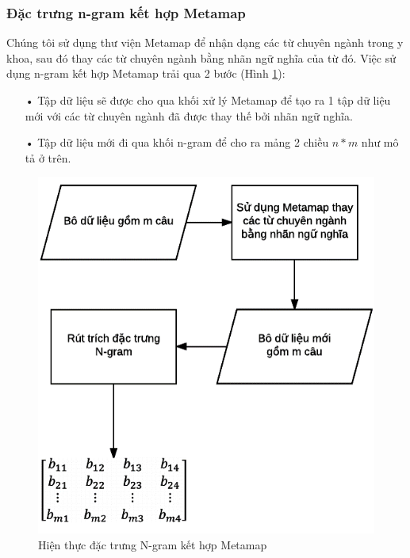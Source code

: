 \subsubsection*{Đặc trưng n-gram kết hợp Metamap}
Chúng tôi sử dụng thư viện Metamap để nhận dạng các từ chuyên ngành trong y khoa, sau đó thay các từ chuyên ngành bằng nhãn ngữ nghĩa của từ đó. 
Việc sử dụng n-gram kết hợp Metamap trải qua 2 bước (Hình \ref{fig:hien-thuc-metamap}):
\begin{itemize}
\item[•] Tập dữ liệu sẽ được cho qua khối xử lý Metamap để tạo ra 1 tập dữ liệu mới với các từ chuyên ngành đã được thay thế bởi nhãn ngữ nghĩa.
\item[•] Tập dữ liệu mới đi qua khối n-gram để cho ra mảng 2 chiều $n*m$ như mô tả ở trên.
\end{itemize}
\begin{figure}[h]
\centering
\includegraphics[scale=0.5]{../hinh/hien_thuc_metamap.png}
\caption{Hiện thực đặc trưng N-gram kết hợp Metamap} \label{fig:hien-thuc-metamap}
\end{figure}
